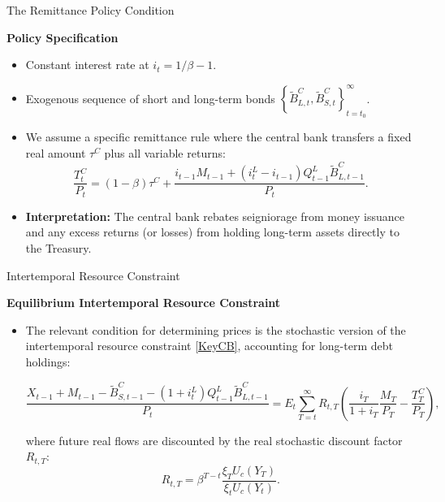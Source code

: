 \documentclass[11pt,aspectratio=169]{beamer}
\begin{document}
\begin{frame}{The Remittance Policy Condition}
\small

\textbf{Policy Specification}
\vspace{0.1cm}
\begin{itemize}
    \item Constant interest rate at $i_t = 1/\beta - 1$.
    \item Exogenous sequence of short and long-term bonds $\left\{ \tilde{B}_{L,t}^{C}, \tilde{B}_{S,t}^{C} \right\}_{t=t_0}^{\infty}$.
    \item We assume a specific remittance rule where the central bank  transfers a fixed real amount $\tau^C$ plus all variable returns:
    \begin{equation}
        \frac{T_{t}^{C}}{P_{t}}=(1-\beta )\tau ^{C}+\frac{i_{t-1}M_{t-1}+(i_{t}^{L}-i_{t-1})Q_{t-1}^{L}\tilde{B}_{L,t-1}^{C}}{P_{t}}. \label{Transfer}
    \end{equation}
    \item \textbf{Interpretation:} The central bank  rebates seigniorage from money issuance and any excess returns (or losses) from holding long-term assets directly to the Treasury.
\end{itemize}
\end{frame}
\begin{frame}{Intertemporal Resource Constraint}
\small

\textbf{Equilibrium Intertemporal Resource Constraint}
\vspace{0.1cm}
\begin{itemize}
    \item The relevant condition for determining prices is the stochastic version of the intertemporal resource constraint \eqref{KeyCB}, accounting for long-term debt holdings:

\begin{equation}
\frac{X_{t-1}+M_{t-1}-\tilde{B}_{S,t-1}^{C}-(1+i_{t}^{L})Q_{t-1}^{L}\tilde{B}_{L,t-1}^{C}}{P_{t}}=E_{t}\sum_{T=t}^{\infty }R_{t,T}\left( \frac{i_{T}}{1+i_{T}}\frac{M_{T}}{P_{T}}-\frac{T_{T}^{C}}{P_{T}}\right), \label{IBC-IR}
\end{equation}

where future real flows are discounted by the real stochastic discount factor $R_{t,T}$:
    \begin{equation*}
        R_{t,T} = \beta ^{T-t} \frac{\xi_{T}U_{c}(Y_{T})}{\xi _{t}U_{c}(Y_{t})}.
    \end{equation*}
\end{itemize}
\end{frame}
\end{document}
